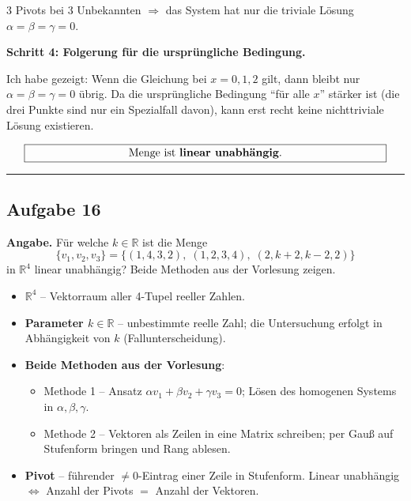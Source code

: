 \documentclass[a4paper,12pt]{article}
\begin{document}
3 Pivots bei 3 Unbekannten $\Rightarrow$ das System hat nur die triviale L\"osung $\alpha = \beta = \gamma = 0$.

\medskip

\textbf{Schritt 4: Folgerung f\"ur die urspr\"ungliche Bedingung.}

Ich habe gezeigt: Wenn die Gleichung bei $x = 0, 1, 2$ gilt, dann bleibt nur $\alpha = \beta = \gamma = 0$ \"ubrig.
Da die urspr\"ungliche Bedingung ``f\"ur alle $x$'' st\"arker ist (die drei Punkte sind nur ein Spezialfall davon),
kann erst recht keine nichttriviale L\"osung existieren.

\[
\fbox{\parbox{0.93\textwidth}{\centering
Menge ist \textbf{linear unabh\"angig}.
}}
\]

\bigskip
\hrule
\bigskip

\subsection*{Aufgabe 16}

\textbf{Angabe.} F\"ur welche $k \in \mathbb{R}$ ist die Menge
\[
\{v_1, v_2, v_3\} = \{(1,4,3,2),\; (1,2,3,4),\; (2, k+2, k-2, 2)\}
\]
in $\mathbb{R}^4$ linear unabh\"angig? Beide Methoden aus der Vorlesung zeigen.

\begin{begriffe}
\begin{itemize}[leftmargin=*, nosep]
    \item $\mathbb{R}^4$ -- Vektorraum aller 4-Tupel reeller Zahlen.
    \item \textbf{Parameter $k \in \mathbb{R}$} -- unbestimmte reelle Zahl; die Untersuchung erfolgt in Abh\"angigkeit von $k$ (Fallunterscheidung).
    \item \textbf{Beide Methoden aus der Vorlesung}:
    \begin{itemize}[nosep]
        \item Methode 1 -- Ansatz $\alpha v_1 + \beta v_2 + \gamma v_3 = 0$; L\"osen des homogenen Systems in $\alpha, \beta, \gamma$.
        \item Methode 2 -- Vektoren als Zeilen in eine Matrix schreiben; per Gau\ss{} auf Stufenform bringen und Rang ablesen.
    \end{itemize}
    \item \textbf{Pivot} -- f\"uhrender $\neq 0$-Eintrag einer Zeile in Stufenform. Linear unabh\"angig $\iff$ Anzahl der Pivots $=$ Anzahl der Vektoren.
\end{itemize}
\end{begriffe}
\end{document}

